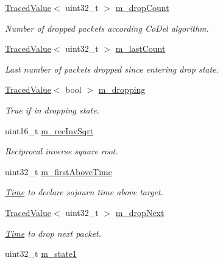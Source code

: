 \begin{DoxyCompactItemize}
\hyperlink{classns3_1_1TracedValue}{Traced\+Value}$<$ uint32\+\_\+t $>$ \hyperlink{classns3_1_1CoDelQueueDisc_ae61e9b4326d0f0b7db697c1e44e1336f}{m\+\_\+drop\+Count}
\begin{DoxyCompactList}\small\item\em Number of dropped packets according Co\+Del algorithm. \end{DoxyCompactList}\item 
\hyperlink{classns3_1_1TracedValue}{Traced\+Value}$<$ uint32\+\_\+t $>$ \hyperlink{classns3_1_1CoDelQueueDisc_aa7cd76433e40f7abd08d724b97732c3d}{m\+\_\+last\+Count}
\begin{DoxyCompactList}\small\item\em Last number of packets dropped since entering drop state. \end{DoxyCompactList}\item 
\hyperlink{classns3_1_1TracedValue}{Traced\+Value}$<$ bool $>$ \hyperlink{classns3_1_1CoDelQueueDisc_ae6b02968204bd5c2e6d68e532ce679c4}{m\+\_\+dropping}
\begin{DoxyCompactList}\small\item\em True if in dropping state. \end{DoxyCompactList}\item 
uint16\+\_\+t \hyperlink{classns3_1_1CoDelQueueDisc_a348cfedf39aedbc10137a50c991df6fa}{m\+\_\+rec\+Inv\+Sqrt}
\begin{DoxyCompactList}\small\item\em Reciprocal inverse square root. \end{DoxyCompactList}\item 
uint32\+\_\+t \hyperlink{classns3_1_1CoDelQueueDisc_acd66659e7066b6d1d322fee745e43adc}{m\+\_\+first\+Above\+Time}
\begin{DoxyCompactList}\small\item\em \hyperlink{classns3_1_1Time}{Time} to declare sojourn time above target. \end{DoxyCompactList}\item 
\hyperlink{classns3_1_1TracedValue}{Traced\+Value}$<$ uint32\+\_\+t $>$ \hyperlink{classns3_1_1CoDelQueueDisc_afb812be3b2ea5064053bdc884144965d}{m\+\_\+drop\+Next}
\begin{DoxyCompactList}\small\item\em \hyperlink{classns3_1_1Time}{Time} to drop next packet. \end{DoxyCompactList}\item 
uint32\+\_\+t \hyperlink{classns3_1_1CoDelQueueDisc_a2f305bba337e0ec5c7ba23ced30737bb}{m\+\_\+state1}

\end{DoxyCompactItemize}
